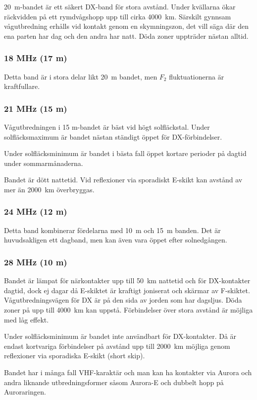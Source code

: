 20~m-bandet är ett säkert DX-band för stora avstånd.
Under kvällarna ökar räckvidden på ett rymdvågshopp upp till cirka 4000~km.
Särskilt gynnsam vågutbredning erhålls vid kontakt genom en skymningszon, det
vill säga där den ena parten har dag och den andra har natt.
Döda zoner uppträder nästan alltid.

\subsubsection{18 MHz (17 m)}

Detta band är i stora delar likt 20~m bandet, men \(F_2\) fluktuationerna
är kraftfullare.

\subsubsection{21 MHz (15 m)}

Vågutbredningen i 15 m-bandet är bäst vid högt solfläckstal.
Under solfläcksmaximum är bandet nästan ständigt öppet för DX-förbindelser.

Under solfläcksminimum är bandet i bästa fall öppet kortare perioder på dagtid
under sommarmånaderna.

Bandet är dött nattetid. Vid reflexioner via sporadiskt E-skikt kan avstånd av
mer än 2000~km överbryggas.

\subsubsection{24 MHz (12 m)}

Detta band kombinerar fördelarna med 10~m och 15~m banden.
Det är huvudsakligen ett dagband, men kan även vara öppet efter solnedgången.

\subsubsection{28 MHz (10 m)}

Bandet är lämpat för närkontakter upp till 50~km nattetid och för DX-kontakter
dagtid, dock ej dagar då E-skiktet är kraftigt joniserat och skärmar av
F-skiktet.
Vågutbredningsvägen för DX är på den sida av jorden som har dagsljus.
Döda zoner på upp till 4000~km kan uppstå.
Förbindelser över stora avstånd är möjliga med låg effekt.

Under solfläcksminimum är bandet inte användbart för DX-kontakter.
Då är endast kortvariga förbindelser på avstånd upp till 2000~km möjliga
genom reflexioner via sporadiska E-skikt (short skip).

Bandet har i många fall VHF-karaktär och man kan ha kontakter via Aurora och
andra liknande utbredningsformer såsom Aurora-E och dubbelt hopp på
Auroraringen.
